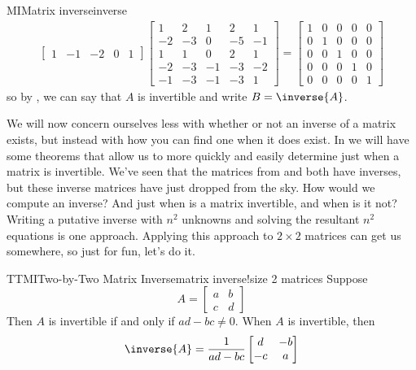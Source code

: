 \begin{example}{MI}{Matrix inverse}{inverse}
\begin{align*}
\begin{bmatrix}
 1 & -1 & -2 & 0 & 1
\end{bmatrix}
\begin{bmatrix}
 1 & 2 & 1 & 2 & 1 \\
 -2 & -3 & 0 & -5 & -1 \\
 1 & 1 & 0 & 2 & 1 \\
 -2 & -3 & -1 & -3 & -2 \\
 -1 & -3 & -1 & -3 & 1
\end{bmatrix}
=
\begin{bmatrix}
1 & 0 & 0 & 0 & 0\\
0 & 1 & 0 & 0 & 0\\
0 & 0 & 1 & 0 & 0\\
0 & 0 & 0 & 1 & 0\\
0 & 0 & 0 & 0 & 1
\end{bmatrix}
\end{align*}
%
so by , we can say that $A$ is invertible and write $B=\inverse{A}$.
%
\end{example}
%
We will now concern ourselves less with whether or not an inverse of a matrix exists, but instead with how you can find one when it does exist.  In  we will have some theorems that allow us to more quickly and easily determine just when a matrix is invertible.
%
%
We've seen that the matrices from  and  both have inverses, but these inverse matrices have just dropped from the sky.  How would we compute an inverse?  And just when is a matrix invertible, and when is it not?  Writing a putative inverse with $n^2$ unknowns and solving the resultant $n^2$ equations is one approach.  Applying this approach to $2\times 2$ matrices can get us somewhere, so just for fun, let's do it.
%
\begin{theorem}{TTMI}{Two-by-Two Matrix Inverse}{matrix inverse!size 2 matrices}
%
Suppose
%
\begin{equation*}
A=
\begin{bmatrix}
a&b\\
c&d
\end{bmatrix}
\end{equation*}
%
Then $A$ is invertible if and only if $ad-bc\neq 0$.  When $A$ is invertible, then
%
\begin{equation*}
\inverse{A}=\frac{1}{ad-bc}
\begin{bmatrix}
d&-b\\
-c&a
\end{bmatrix}
\end{equation*}
%
\end{theorem}
